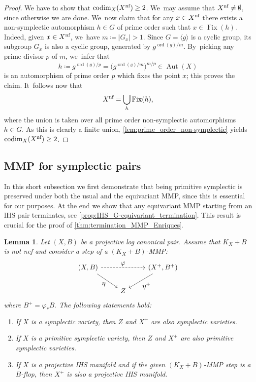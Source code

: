 \documentclass[JEP,XML,SOM,Unicode,published]{cedram}
\let\ts\textstyle
\theoremstyle{plain}
\newtheorem{lem}[thm]{Lemma}
\theoremstyle{definition}
\DeclareMathOperator{\codim}{codim}
\DeclareMathOperator{\Aut}{Aut}
\DeclareMathOperator{\Fix}{Fix}
\DeclareMathOperator{\ord}{ord}
\begin{document}
\begin{proof}
We have to show that $\codim_X (X^\textup{nf}) \geq 2$. We~may assume that $X^\textup{nf} \neq \emptyset$, since otherwise we are done. We~now claim that for any $x \in X^\textup{nf}$ there exists a non-symplectic automorphism $h \in G$ of prime order such that $x \in \Fix(h)$. Indeed, given $x \in X^\textup{nf}$, we~have $m \coloneqq |G_x| >1$. Since $G = \langle g \rangle$ is a cyclic group, its subgroup $G_x$ is also a cyclic group, generated by $g^{\ord(g)/m}$. By~picking any prime divisor $p$ of $m$, we~infer that
\[
h \coloneqq g^{\ord(g) / p} = \bigl(g^{\ord(g) / m}\bigr)^{m/p} \in \Aut(X)
\]
is an automorphism of prime order $p$ which fixes the point $x$; this proves the claim. It~follows now that
\[
X^\textup{nf} = \bigcup_h \Fix(h),
\]
where the union is taken over all prime order non-symplectic automorphisms $h \in G$. As this is clearly a finite union, \autoref{lem:prime_order_non-symplectic} yields $\codim_X (X^\textup{nf}) \geq 2$.
\end{proof}

\subsection{MMP for symplectic pairs}
\label{subsection:MMP_symplectic}

In this short subsection we first demonstrate that being primitive symplectic is preserved under both the usual and the equivariant MMP, since this is essential for our purposes. At the end we show that any equivariant MMP starting from an IHS pair terminates, see \autoref{prop:IHS_G-equivariant_termination}. This result is crucial for the proof of \autoref{thm:termination_MMP_Enriques}.

\begin{lem}
\label{lem:MMP_step_symplectic}
Let $(X,B)$ be a projective log canonical pair. Assume that $K_X + B$ is not nef and consider a step of a $(K_X+B)$-MMP:
\[
\begin{tikzcd}
(X, B) \arrow[dr, "\ts \eta" swap] \arrow[rr, "\ts \varphi", dashed] && (X^+, B^+) \arrow[dl, "\ts \eta^+"] \\
& Z
\end{tikzcd}
\]
where $B^+ = \varphi_* B$. The following statements hold:
\begin{enumerate}
\item\label{lem:MMP_step_symplectici}
If $X$ is a symplectic variety, then $Z$ and $X^+$ are also symplectic varieties.

\item\label{lem:MMP_step_symplecticii}
If $X$ is a primitive symplectic variety, then $Z$ and $X^+$ are also primitive symplectic varieties.

\item\label{lem:MMP_step_symplecticiii}
If $X$ is a projective IHS manifold and if the given $(K_X+B)$-MMP step is a $B$-flop, then $X^+$ is also a projective IHS manifold.
\end{enumerate}
\end{lem}
\end{document}
